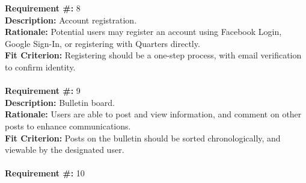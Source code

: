\documentclass[12pt]{article}
\begin{document}
\textbf{Requirement \#:} 8
       \\
      \textbf{Description: }{Account registration.} \\
      \textbf{Rationale: }{Potential users may register an account using 
Facebook Login, Google Sign-In, or registering with Quarters directly.} \\
      \textbf{Fit Criterion: }{Registering should be a one-step process, with 
email verification to confirm identity.} \\ \\ 
\textbf{Requirement \#:} 9
      \\
      \textbf{Description: }{Bulletin board.} \\
      \textbf{Rationale: }{Users are able to post and view information, and 
comment on other posts to enhance communications.} \\
      \textbf{Fit Criterion: }{Posts on the bulletin should be sorted 
chronologically, and viewable by the designated user.} \\ \\        
\textbf{Requirement \#:} 10
\end{document}
